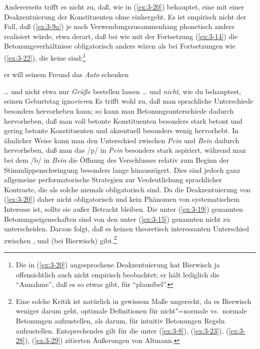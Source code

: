 \documentclass[output=paper]{langsci/langscibook}
\begin{document}
Andererseits trifft es nicht zu, daß, wie in (\ref{ex:3-20}) behauptet, eine  mit einer Deakzentuierung der  Konstituenten ohne  einhergeht. Es
ist empirisch nicht der Fall, daß \zb (\ref{ex:3-9a}) je nach Verwendungszusammenhang phonetisch
anders realisiert würde, etwa derart, daß bei  wie mit der
Fortsetzung (\ref{ex:3-14}) die Betonungsverhältnisse obligatorisch anders wären als bei
Fortsetzungen wie (\ref{ex:3-22}), die keine 
sind:\footnote{\label{fn:3-5}%
  Die in (\ref{ex:3-20}) angesprochene Deakzentuierung hat Bierwisch ja offensichtlich auch nicht
  empirisch beobachtet; er hält lediglich die "`Annahme"', daß es so etwas gibt, für
  "`plausibel"'.%
}
\begin{exe}
	\begin{xlist}
		\ex	er will seinem Freund das \textit{Auto} schenken
	\end{xlist}
\end{exe}
\eal \label{ex:3-22}
\ex
\label{ex:3-22a}
\ldots{} und nicht etwa nur \textit{Grüße} bestellen lassen
\ex
\label{ex:3-22b}
\ldots{} und \textit{nicht}, wie du behauptest, seinen Geburtstag igno\textit{rier}en
\zl
\largerpage[-1]
Es trifft wohl zu, daß man sprachliche Unterschiede besonders
hervorheben kann; so kann man Betonungsunterschiede dadurch
hervorheben, daß man voll betonte Konstituenten besonders stark betont
und gering betonte Konstituenten  und akzentuell
besonders wenig hervorhebt. In ähnlicher Weise kann man den
Unterschied zwischen \textit{Pein} und \textit{Bein} dadurch hervorheben, daß man das /p/
in \textit{Pein} besonders stark aspiriert, während man bei dem /b/ in \textit{Bein} die
Öffnung des Verschlusses relativ zum Beginn der Stimmlippenschwingung
besonders lange hinauszögert. Dies sind jedoch ganz allgemeine
performatorische Strategien zur Verdeutlichung sprachlicher Kontraste,
die als solche niemals obligatorisch sind. Da die Deakzentuierung von
(\ref{ex:3-20}) daher nicht obligatorisch und kein Phänomen von systematischem
Interesse ist, sollte sie außer Betracht bleiben. Die unter (\ref{ex:3-19})
genannten Betonungseigenschaften sind von den unter (\ref{ex:3-15}) genannten
nicht zu unterscheiden. Daraus folgt, daß es keinen theoretisch
interessanten Unterschied zwischen ,
 und   (bei
Bierwisch) gibt.\footnote{\label{fn:3-6}%
  Eine solche Kritik ist natürlich in gewissem Maße ungerecht, da es Bierwisch weniger darum geht,
  optimale Definitionen für nicht"=normale vs.\ normale Betonungen aufzustellen, als darum, für
  intuitiv  Betonungen Regeln aufzustellen. Entsprechendes gilt für die unter
  (\ref{ex:3-8}), (\ref{ex:3-23}), (\ref{ex:3-28}), (\ref{ex:3-29}) zitierten Äußerungen von Altmann.%
}
\end{document}
